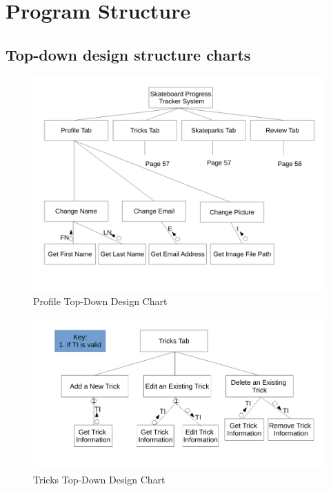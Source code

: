 \section{Program Structure}

\subsection{Top-down design structure charts}

\begin{figure}[H]
    \includegraphics[width=\textwidth]{./design/HDiagrams/Profile.pdf}
    \caption{Profile Top-Down Design Chart} \label{fig:Profile}
\end{figure}

\begin{figure}[H]
    \includegraphics[width=\textwidth]{./design/HDiagrams/Tricks.pdf}
    \caption{Tricks Top-Down Design Chart} \label{fig:Tricks}
\end{figure}


